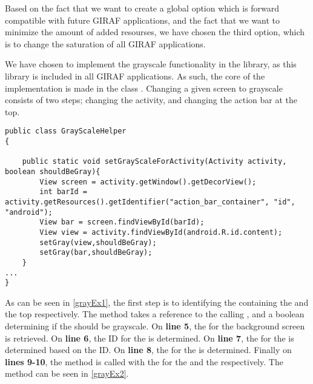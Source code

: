 Based on the fact that we want to create a global option which is forward
compatible with future GIRAF applications, and the fact that we want
to minimize the amount of added resourses, we have chosen the third
option, which is to change the saturation of all GIRAF applications.\nl

We have chosen to implement the grayscale functionality in the
 library, as this library is included in all GIRAF
applications. As such, the core of the implementation is made in the class
. Changing a given screen to grayscale consists of two
steps; changing the activity, and changing the action bar at the top.\nl

\begin{minipage}[H]{\linewidth}
\begin{lstlisting}[caption = Code used to determine the views for the activity and the top action bar., label = grayEx1] 
public class GrayScaleHelper
{

    public static void setGrayScaleForActivity(Activity activity, boolean shouldBeGray){
        View screen = activity.getWindow().getDecorView();
        int barId = activity.getResources().getIdentifier("action_bar_container", "id", "android");
        View bar = screen.findViewById(barId);
        View view = activity.findViewById(android.R.id.content);
        setGray(view,shouldBeGray);
        setGray(bar,shouldBeGray);
    }
...
}
\end{lstlisting}
\end{minipage}

As can be seen in \autoref{grayEx1}, the first step is to identifying the
 containing the  and the top 
respectively. The method  takes a reference to
the calling , and a boolean determining if the 
should be grayscale. On \textbf{line 5}, the  for the background
 screen is retrieved. On \textbf{line 6}, the ID for the
 is determined. On \textbf{line 7}, the  for the
 is determined based on the ID. On \textbf{line 8}, the
 for the  is determined. Finally on \textbf{lines 9-10}, the 
method is called with the  for the  and the
 respectively. The  method can be seen in
\autoref{grayEx2}.\nl

